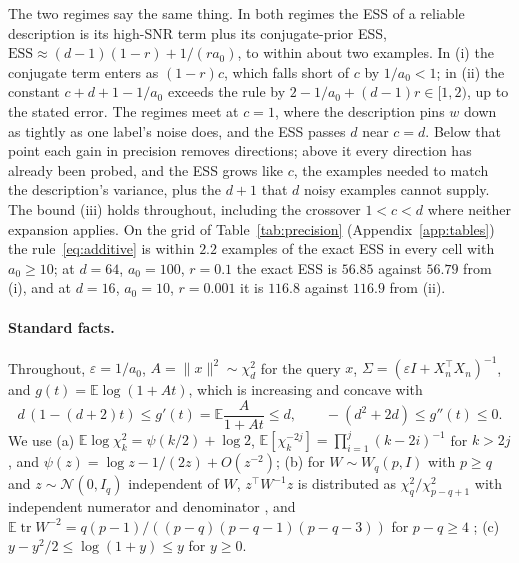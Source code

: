\documentclass[10pt]{article}
\newcommand{\ess}{\mathrm{ESS}}
\newcommand{\E}{\mathbb{E}}
\begin{document}
The two regimes say the same thing. In both regimes the ESS of a reliable description is its high-SNR term plus its conjugate-prior ESS,
$\ess \approx (d-1)(1-r) + 1/(r a_0)$,
to within about two examples. In (i) the conjugate term enters as $(1-r)c$, which falls short of $c$ by $1/a_0 < 1$; in (ii) the constant $c + d + 1 - 1/a_0$ exceeds the rule by $2 - 1/a_0 + (d-1)r \in [1, 2)$, up to the stated error. The regimes meet at $c = 1$, where the description pins $w$ down as tightly as one label's noise does, and the ESS passes $d$ near $c = d$. Below that point each gain in precision removes directions; above it every direction has already been probed, and the ESS grows like $c$, the examples needed to match the description's variance, plus the $d + 1$ that $d$ noisy examples cannot supply. The bound (iii) holds throughout, including the crossover $1 < c < d$ where neither expansion applies. On the grid of Table~\ref{tab:precision} (Appendix~\ref{app:tables}) the rule~\eqref{eq:additive} is within $2.2$ examples of the exact ESS in every cell with $a_0 \ge 10$; at $d = 64$, $a_0 = 100$, $r = 0.1$ the exact ESS is $56.85$ against $56.79$ from (i), and at $d = 16$, $a_0 = 10$, $r = 0.001$ it is $116.8$ against $116.9$ from (ii).

\newtheorem{lemma}{Lemma}[section]

\paragraph{Standard facts.}
Throughout, $\varepsilon = 1/a_0$, $A = \|x\|^2 \sim \chi^2_d$ for the query $x$, $\Sigma = (\varepsilon I + X_n^\top X_n)^{-1}$, and $g(t) = \E \log(1 + At)$, which is increasing and concave with
\begin{equation}\label{eq:g-derivs}
d\,(1 - (d+2)t) \le g'(t) = \E \frac{A}{1 + At} \le d,
\qquad
-(d^2 + 2d) \le g''(t) \le 0 .
\end{equation}
We use (a) $\E \log \chi^2_k = \psi(k/2) + \log 2$, $\E[\chi_k^{-2j}] = \prod_{i=1}^{j} (k - 2i)^{-1}$ for $k > 2j$, and $\psi(z) = \log z - 1/(2z) + O(z^{-2})$; (b) for $W \sim W_q(p, I)$ with $p \ge q$ and $z \sim \mathcal{N}(0, I_q)$ independent of $W$, $z^\top W^{-1} z$ is distributed as $\chi^2_q / \chi^2_{p-q+1}$ with independent numerator and denominator \citep[Theorem~3.2.12]{muirhead1982}, and $\E \operatorname{tr} W^{-2} = q(p-1)/((p-q)(p-q-1)(p-q-3))$ for $p - q \ge 4$ \citep{vonrosen1988}; (c) $y - y^2/2 \le \log(1 + y) \le y$ for $y \ge 0$.
\end{document}
